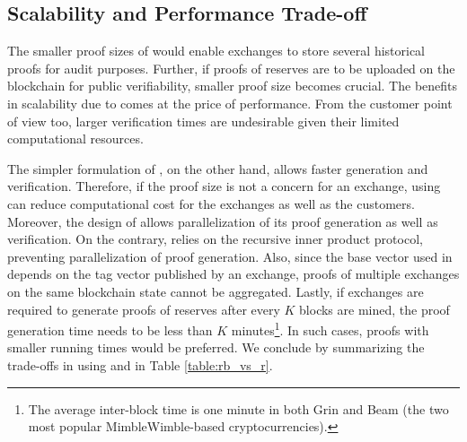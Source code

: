   \subsection{Scalability and Performance Trade-off}
  
  The smaller proof sizes of \RB would enable exchanges to store several historical proofs for audit purposes.
  Further, if proofs of reserves are to be uploaded on the blockchain for public verifiability, smaller proof size becomes crucial.
  The benefits in scalability due to \RB comes at the price of performance.
  From the customer point of view too, larger verification times are undesirable given their limited computational resources.
  
  The simpler formulation of \Rw, on the other hand, allows faster generation and verification. 
  Therefore, if the proof size is not a concern for an exchange, using \R can reduce computational cost for the exchanges as well as the customers. 
  Moreover, the design of \R allows parallelization of its proof generation as well as verification.
  On the contrary, \RB relies on the recursive inner product protocol, preventing parallelization of proof generation.
  Also, since the base vector used in \RB depends on the tag vector published by an exchange, \RB proofs of multiple exchanges on the same blockchain state cannot be aggregated.  
  Lastly, if exchanges are required to generate proofs of reserves after every $K$ blocks are mined, the proof generation time needs to be less than $K$ minutes\footnote{The average inter-block time is one minute in both Grin and Beam (the two most popular MimbleWimble-based cryptocurrencies).}.
  In such cases, proofs with smaller running times would be preferred.
  We conclude by summarizing the trade-offs in using \R and \RB in Table \ref{table:rb_vs_r}.
  
